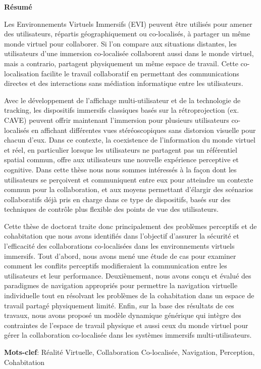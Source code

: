 \centerline{\LARGE \textbf{Résumé}}

\vspace*{\baselineskip}
Les Environnements Virtuels Immersifs (EVI) peuvent être utilisés pour amener des utilisateurs, répartis géographiquement ou co-localisés, à partager un même monde virtuel pour collaborer. Si l’on compare aux situations distantes, les utilisateurs d’une immersion co-localisée collaborent aussi  dans le monde virtuel, mais a contrario, partagent physiquement un même espace de travail. Cette co-localisation facilite le travail collaboratif en permettant des communications directes et des interactions sans médiation informatique entre les utilisateurs.

Avec le développement de l'affichage multi-utilisateur et de la technologie de tracking, les dispositifs immersifs classiques basés sur la rétroprojection (ex. CAVE) peuvent offrir maintenant l'immersion pour plusieurs utilisateurs co-localisés en affichant différentes vues stéréoscopiques sans distorsion visuelle pour chacun d’eux. Dans ce contexte, la coexistence de l'information du monde virtuel et réel, en particulier lorsque les utilisateurs ne partagent pas un référentiel spatial commun, offre aux utilisateurs une nouvelle expérience perceptive et cognitive. Dans cette thèse nous nous sommes intéressés à la façon dont les utilisateurs se perçoivent et communiquent entre eux pour atteindre un contexte commun pour la collaboration, et aux moyens permettant d’élargir des scénarios collaboratifs déjà pris en charge dans ce type de dispositifs, basés sur des techniques de contrôle plus flexible des points de vue des utilisateurs.
 
Cette thèse de doctorat traite donc principalement des problèmes perceptifs et de cohabitation que nous avons identifiés dans l’objectif d’assurer la sécurité et l’efficacité des collaborations co-localisées dans les environnements virtuels immersifs. Tout d'abord, nous avons mené une étude de cas pour examiner comment les conflits perceptifs modifieraient la communication entre les utilisateurs et leur performance. Deuxièmement, nous avons conçu et évalué des paradigmes de navigation appropriés pour permettre la navigation virtuelle individuelle tout en résolvant les problèmes de la cohabitation dans un espace de travail partagé physiquement limité. Enfin, sur la base des résultats de ces travaux, nous avons proposé un modèle dynamique générique qui intègre des contraintes de l'espace de travail physique et aussi ceux du monde virtuel pour gérer la collaboration co-localisée dans les systèmes immersifs multi-utilisateurs.


\textbf{Mots-clef}: Réalité Virtuelle, Collaboration Co-localisée, Navigation, Perception, Cohabitation